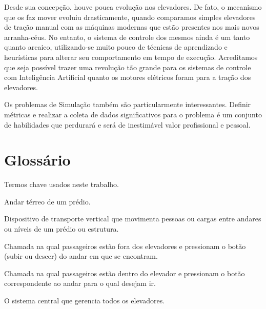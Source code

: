 Desde sua concepção, houve pouca evolução nos elevadores. De fato, o mecanismo
que os faz mover evoluiu drasticamente, quando comparamos simples elevadores de
tração manual com as máquinas modernas que estão presentes nos mais novos
arranha-céus. No entanto, o sistema de controle dos mesmos ainda é um tanto
quanto arcaico, utilizando-se muito pouco de técnicas de aprendizado e
heurísticas para alterar seu comportamento em tempo de execução. Acreditamos que
seja possível trazer uma revolução tão grande para os sistemas de controle com
Inteligência Artificial quanto os motores elétricos foram para a tração dos elevadores.

Os problemas de Simulação também são particularmente interessantes. Definir
métricas e realizar a coleta de dados significativos para o problema é um
conjunto de habilidades que perdurará e será de inestimável valor profissional e pessoal.

\section{Glossário}

Termos chave usados neste trabalho.

\begin{description}[leftmargin=!,labelwidth=\widthof{\bfseries Sistema de Controle}]
  \item[Lobby]                Andar térreo de um prédio.
  \item[Elevador]             Dispositivo de transporte vertical que movimenta pessoas ou cargas entre andares ou níveis de um prédio ou estrutura.
  \item[pickup call]          Chamada na qual passageiros estão fora dos elevadores e pressionam o botão (subir ou descer) do andar em que se encontram.
  \item[cabin call]           Chamada na qual passageiros estão dentro do elevador e pressionam o botão correspondente ao andar para o qual desejam ir.
  \item[Sistema de Controle]  O sistema central que gerencia todos os elevadores.
\end{description}